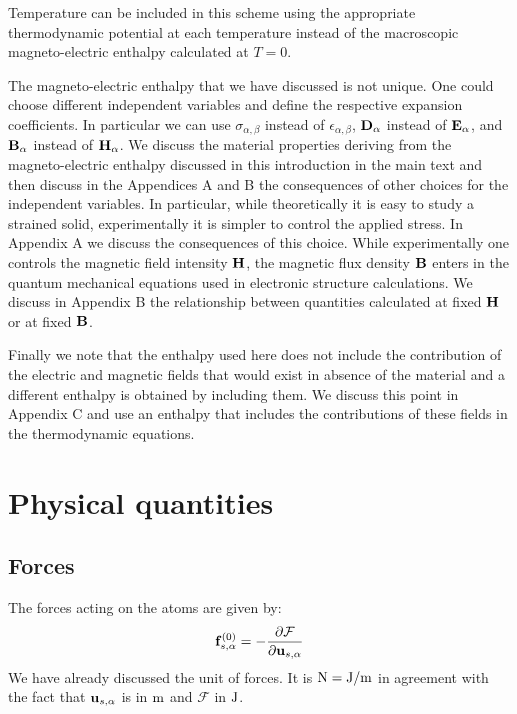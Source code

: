 \documentclass[12pt,a4paper,twoside]{report}
\begin{document}
Temperature can be included in this scheme using the appropriate
thermodynamic potential at each temperature instead of the macroscopic
magneto-electric enthalpy calculated at $T=0$. 

The magneto-electric enthalpy that we have discussed is not unique. One could 
choose different independent 
variables and define the respective expansion coefficients. In particular 
we can use $\sigma_{\alpha,\beta}$ instead of $\epsilon_{\alpha,\beta}$, 
${\bf D}_\alpha$ instead of ${\bf E}_\alpha$, and ${\bf B}_\alpha$ instead of
${\bf H}_\alpha$. 
We discuss the material properties deriving from the magneto-electric
enthalpy discussed in this introduction in the
main text and then discuss in the Appendices A and B the consequences 
of other choices for the independent variables.
In particular, while theoretically it is easy to study a strained solid,
experimentally it is simpler to control the applied stress. In Appendix A 
we discuss the consequences of this choice. 
While experimentally one controls the magnetic field intensity
${\bf H}$, the magnetic flux density ${\bf B}$ enters in the quantum
mechanical equations used in electronic structure calculations. 
We discuss in Appendix B the relationship between quantities 
calculated at fixed ${\bf H}$ or at fixed ${\bf B}$. 

Finally we note that the enthalpy used here does not include the contribution 
of the electric and magnetic fields that would exist in absence of the 
material and a different enthalpy is obtained by including them. 
We discuss this point in Appendix C and use an enthalpy that includes
the contributions of these fields in the thermodynamic equations.

\newpage

{\color{dark-blue}\chapter{Physical quantities}}
\color{black}

{\color{coral}\section{Forces}}
\color{black}

The forces acting on the atoms are given by:
\begin{equation}
{\bf f}^{(0)}_{s,\alpha}=-{\partial \mathcal{F} \over \partial {\bf u}_{s,\alpha}}
\label{force}
\end{equation}
We have already discussed the unit of forces. It is ${\rm N}={\rm J}/{\rm m}$ in agreement
with the fact that ${\bf u}_{s,\alpha}$ is in ${\rm m}$ and $\mathcal{F}$ in ${\rm J}$.
\\
\end{document}
